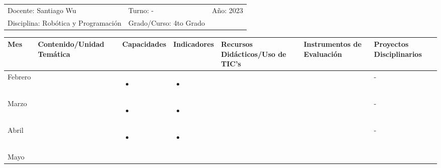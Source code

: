 \documentclass[landscape, a4paper, 10pt]{article}
\newcommand{\smallcellwidth}{0.7in}
\newcommand{\normalcellwidth}{1.2in}
\newcommand{\bigcellwidth}{2.0in}
\newcommand{\profesor}{Santiago Wu}
\newcommand{\discipline}{Robótica y Programación}
\newcommand{\currentyear}{2023}
\begin{document}
	\pagebreak[4]
	\begin{tabularx}{\textwidth}{ >{\raggedright\arraybackslash}X >{\raggedright\arraybackslash}X >{\raggedright\arraybackslash}X }
		Docente: \profesor &
		Turno: - &
		Año: \currentyear \\
		Disciplina: \discipline &
		Grado/Curso: 4to Grado &
		 \\
	\end{tabularx}
	\centering
	\begin{longtable}{|m{\smallcellwidth}|p{\normalcellwidth}|p{\bigcellwidth}|p{\bigcellwidth}|p{\normalcellwidth}|p{\normalcellwidth}|p{\normalcellwidth}|}
		\hline
		\textbf{Mes} &
		\textbf{Contenido/Unidad Temática} &
		\textbf{Capacidades} &
		\textbf{Indicadores} &
		\textbf{Recursos Didácticos/Uso de TIC's} &
		\textbf{Instrumentos de Evaluación} &
		\textbf{Proyectos Disciplinarios} \\
		\hline
		\endhead
		Febrero &
		 &
		\begin{itemize}
			\item 
		\end{itemize} &
		\begin{itemize}
			\item 
		\end{itemize} &
		  &
		  &
		 - \\
		\hline
		Marzo &
		 &
		\begin{itemize}
			\item 
		\end{itemize} &
		\begin{itemize}
			\item 
		\end{itemize} &
		  &
		  &
		 - \\
		\hline
		Abril &
		 &
		\begin{itemize}
			\item 
		\end{itemize} &
		\begin{itemize}
			\item 
		\end{itemize} &
		  &
		  &
		 - \\
		\hline
		Mayo &
		 &
		\begin{itemize}

\end{itemize}
\end{longtable}
\end{document}

